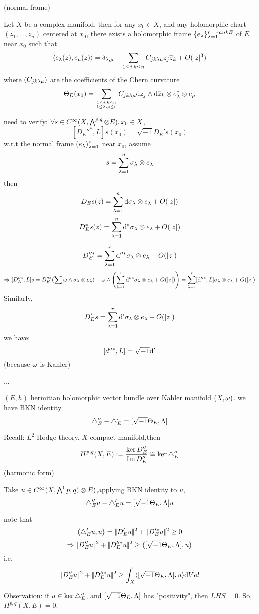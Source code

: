 \begin{lemma}(normal frame)

Let $X$ be a complex manifold, then for any $x_0\in X$,
and any holomorphic chart $(z_1,...,z_n)$ centered at $x_0$,
there exists a holomorphic frame $\{e_\lambda\}_{\lambda=1}^{r:=rank E}$
of $E$ near $x_0$ such that
$$
  \left\langle
    e_{\lambda}(z),e_{\mu}(z)
  \right\rangle
=
  \delta_{\lambda,\mu}-
  \sum_{1\leq j,k \leq n}
  C_{jk\lambda\mu}
  z_j\overline{z}_k
+
 O(|z|^3)
$$
where $(C_{jk\lambda\mu})$ are the coefficients of the Chern curvature
$$\Theta_E(x_0)=
  \sum_{1\leq j,k\leq n\atop 1\leq\lambda,\mu\leq r}
    C_{jk\lambda\mu}
    \mathrm{d} z_j\wedge\mathrm{d} \overline{z}_{k}\otimes e_\lambda^*\otimes e_\mu
$$
\end{lemma}


need to verify: $\forall s\in C^\infty(X,\bigwedge\nolimits^{p,q}\otimes E),x_0\in X$,
$$[D_E''^*,L]s(x_0)=\sqrt{-1}D_E's(x_0)$$
w.r.t the normal frame $(e_\lambda)_{\lambda=1}^r$ near $x_0$, assume
$$s=\sum_{\lambda=1}^{n}\sigma_\lambda\otimes e_\lambda$$
then
$$
  D_Es(z)=\sum_{\lambda=1}^{n}
    \mathrm{d}\sigma_\lambda\otimes e_\lambda +O(|z|)
$$
$$
  D_E^*s(z)=\sum_{\lambda=1}^{n}
    \mathrm{d}^*\sigma_\lambda\otimes e_\lambda +O(|z|)
$$

$$D_E''^*=\sum_{\lambda=1}^{r} \mathrm{d}''^*\sigma_\lambda\otimes e_\lambda+O(|z|)$$
$$
  \Rightarrow
  [D_E''^*,L]s=
  D_E''^*(\sum\omega\wedge\sigma_\lambda\otimes e_\lambda)
 -\omega\wedge
 \left(
   \sum_{\lambda=1}^{r}
   \mathrm{d}''^*\sigma_\lambda\otimes e_\lambda+O(|z|)
 \right)
=
  \sum_{\lambda=1}^{r}
    [\mathrm{d}''^*,L]\sigma_\lambda\otimes e_\lambda+O(|z|)
$$
Similarly,
$$
  D_E's
=
  \sum_{\lambda=1}^{r}
    \mathrm{d}'\sigma_\lambda\otimes e_\lambda+O(|z|)
$$
we have:
$$
  [d''^*,L]=\sqrt{-1}\mathrm{d}'
$$
(because $\omega$ is Kahler)

...

$(E,h)$ hermitian holomorphic vector bundle over Kahler manifold $(X,\omega)$.
we have BKN identity
$$
  \triangle_E''-\triangle_E'=[\sqrt{-1}\Theta_E,\Lambda]
$$

Recall: $L^2$-Hodge theory. $X$ compact manifold,then
$$
  H^{p,q}(X,E):=
  \frac{\ker D_E''}{\operatorname{Im} D_E''}
\cong
  \ker\triangle_E''
$$
(harmonic form)

Take $u\in C^\infty(X,\bigwedge\nolimits^(p,q)\otimes E)$,applying BKN identity to $u$,
$$\triangle_E''u-\triangle_E'u=[\sqrt{-1}\Theta_E,\Lambda]u$$

note that
$$\ppair{\yc_E'u}{u}=\norm{D_E'u}^2+\norm{D_E'^*u}^2\geq 0$$
$$
  \Rightarrow
  \norm{D_E''u}^2+\norm{D_E''^*u}^2
\geq
  \ppair{[\sqrt{-1}\Theta_E,\Lmd]}{u}
$$
i.e.
$$
  |\!|D_E''u|\!|^2+|\!|D_E''^*u|\!|^2
\geq
  \int_X\langle [\sqrt{-1}\Theta_E,\Lambda],u \rangle
  \mathrm{d} Vol
$$

Observation: if $u\in\ker\triangle_E''$, and $[\sqrt{-1}\Theta_E,\Lambda]$
has "positivity",
then $LHS=0$. So, $H^{p,q}(X,E)=0$.

